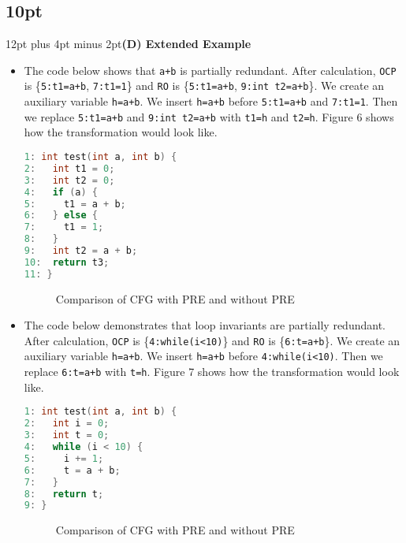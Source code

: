 \documentclass[onecolumn,10pt]{journal}
\begin{document}
\pagebreak
\titlespacing\subsection*{10pt}{12pt plus 4pt minus 2pt}\textbf{(D) Extended Example}
\begin{itemize}
\item  The code below shows that \texttt{a+b} is partially redundant. After calculation, \texttt{OCP} is \{\texttt{5:t1=a+b}, \texttt{7:t1=1}\} and \texttt{RO} is \{\texttt{5:t1=a+b}, \texttt{9:int t2=a+b}\}. We create an auxiliary variable \texttt{h=a+b}. We insert \texttt{h=a+b} before \texttt{5:t1=a+b} and \texttt{7:t1=1}. Then we replace \texttt{5:t1=a+b} and \texttt{9:int t2=a+b} with \texttt{t1=h} and \texttt{t2=h}. Figure 6 shows how the transformation would look like.   
\begin{lstlisting}[language=c]
1: int test(int a, int b) {
2:   int t1 = 0;
3:   int t2 = 0;
4:   if (a) {
5:     t1 = a + b;
6:   } else {
7:     t1 = 1;
8:   }
9:   int t2 = a + b;
10:  return t3;
11: }
\end{lstlisting}

\begin{figure}[bp!]
     \centering
     \caption{Comparison of CFG with PRE and without PRE}
     \label{if}
\end{figure}

\item The code below demonstrates that loop invariants are partially redundant. After calculation, \texttt{OCP} is \{\texttt{4:while(i<10)}\} and \texttt{RO} is \{\texttt{6:t=a+b}\}. We create an auxiliary variable \texttt{h=a+b}. We insert \texttt{h=a+b} before \texttt{4:while(i<10)}. Then we replace \texttt{6:t=a+b} with \texttt{t=h}. Figure 7 shows how the transformation would look like.     
\begin{lstlisting}[language=c]
1: int test(int a, int b) {
2:   int i = 0;
3:   int t = 0;
4:   while (i < 10) {
5:     i += 1;
6:     t = a + b;
7:   }
8:   return t;
9: }
\end{lstlisting}

\begin{figure}[bp!]
     \centering
     \caption{Comparison of CFG with PRE and without PRE}
     \label{while}
\end{figure}
 
\end{itemize}
\end{document}
